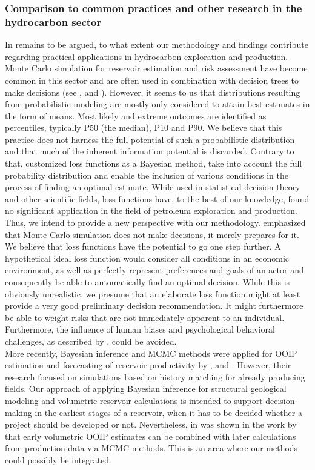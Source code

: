 	\subsubsection{Comparison to common practices and other research in the hydrocarbon sector}		
	In remains to be argued, to what extent our methodology and findings contribute regarding practical applications in hydrocarbon exploration and production. Monte Carlo simulation for reservoir estimation and risk assessment have become common in this sector and are often used in combination with decision trees to make decisions (see \citet{murtha1997monte}, \citet{mudford2000valuing} and \citet{bratvold2010making}). However, it seems to us that distributions resulting from probabilistic modeling are mostly only considered to attain best estimates in the form of means. Most likely and extreme outcomes are identified as percentiles, typically P50 (the median), P10 and P90. We believe that this practice does not harness the full potential of such a probabilistic distribution and that much of the inherent information potential is discarded. Contrary to that, customized loss functions as a Bayesian method, take into account the full probability distribution and enable the inclusion of various conditions in the process of finding an optimal estimate. While used in statistical decision theory and other scientific fields, loss functions have, to the best of our knowledge, found no significant application in the field of petroleum exploration and production. Thus, we intend to provide a new perspective with our methodology. \citet{murtha1997monte} emphasized that Monte Carlo simulation does not make decisions, it merely prepares for it. We believe that loss functions have the potential to go one step further. A hypothetical ideal loss function would consider all conditions in an economic environment, as well as perfectly represent preferences and goals of an actor and consequently be able to automatically find an optimal decision. While this is obviously unrealistic, we presume that an elaborate loss function might at least provide a very good preliminary decision recommendation. It might furthermore be able to weight risks that are not immediately apparent to an individual. Furthermore, the influence of human biases and psychological behavioral challenges, as described by \citet{bratvold2010making}, could be avoided.\\
	More recently, Bayesian inference and MCMC methods were applied for OOIP estimation and forecasting of reservoir productivity by \citet{wadsley2005markov}, \citet{ma2006multistage} and \citet{liu2010continuous}. However, their research focused on simulations based on history matching for already producing fields. Our approach of applying Bayesian inference for structural geological modeling and volumetric reservoir calculations is intended to support decision-making in the earliest stages of a reservoir, when it has to be decided whether a project should be developed or not. Nevertheless, in was shown in the work by \citet{wadsley2005markov} that early volumetric OOIP estimates can be combined with later calculations from production data via MCMC methods. This is an area where our methods could possibly be integrated.\\
